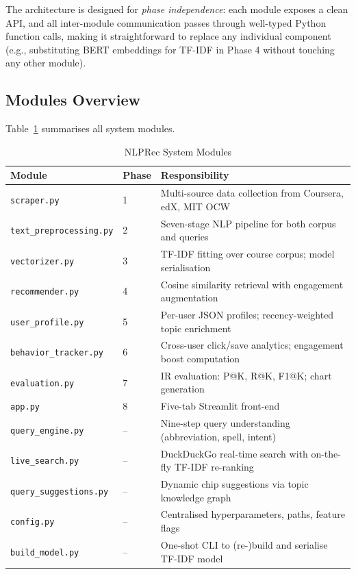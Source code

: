 \documentclass[12pt, a4paper]{article}
\begin{document}
The architecture is designed for \textit{phase independence}: each module exposes a clean API,
and all inter-module communication passes through well-typed Python function calls, making it
straightforward to replace any individual component (e.g., substituting BERT embeddings for TF-IDF
in Phase 4 without touching any other module).

\subsection{Modules Overview}

Table~\ref{tab:modules} summarises all system modules.

\begin{table}[htbp]
\centering
\caption{NLPRec System Modules}
\label{tab:modules}
\renewcommand{\arraystretch}{1.25}
\begin{tabular}{p{3.5cm} p{1.5cm} p{7.5cm}}
\toprule
\textbf{Module} & \textbf{Phase} & \textbf{Responsibility} \\
\midrule
\texttt{scraper.py}          & 1 & Multi-source data collection from Coursera, edX, MIT OCW \\
\texttt{text\_preprocessing.py} & 2 & Seven-stage NLP pipeline for both corpus and queries \\
\texttt{vectorizer.py}       & 3 & TF-IDF fitting over course corpus; model serialisation \\
\texttt{recommender.py}      & 4 & Cosine similarity retrieval with engagement augmentation \\
\texttt{user\_profile.py}    & 5 & Per-user JSON profiles; recency-weighted topic enrichment \\
\texttt{behavior\_tracker.py} & 6 & Cross-user click/save analytics; engagement boost computation \\
\texttt{evaluation.py}       & 7 & IR evaluation: P@K, R@K, F1@K; chart generation \\
\texttt{app.py}              & 8 & Five-tab Streamlit front-end \\
\midrule
\texttt{query\_engine.py}    & –  & Nine-step query understanding (abbreviation, spell, intent) \\
\texttt{live\_search.py}     & –  & DuckDuckGo real-time search with on-the-fly TF-IDF re-ranking \\
\texttt{query\_suggestions.py} & – & Dynamic chip suggestions via topic knowledge graph \\
\texttt{config.py}           & –  & Centralised hyperparameters, paths, feature flags \\
\texttt{build\_model.py}     & –  & One-shot CLI to (re-)build and serialise TF-IDF model \\
\bottomrule
\end{tabular}
\end{table}
\end{document}
